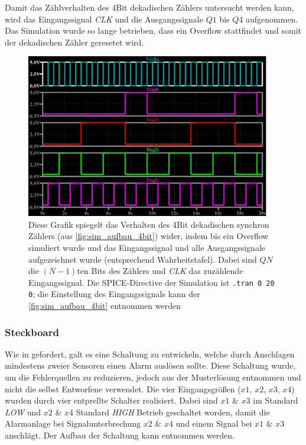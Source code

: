 \documentclass[12pt,english,ngerman]{scrartcl}
\begin{document}
Damit das Zählverhalten des 4Bit dekadischen Zählers untersucht werden kann,
wird das Eingangssignal \textit{CLK} und die Ausgangssignale $Q1$ bis $Q4$
aufgenommen. Das Simulation wurde so lange betrieben, dass ein Overflow
stattfindet und somit der dekadischen Zähler geresetet wird. 

\begin{figure}[H]
  \centering
    \includegraphics[width=0.95\textwidth]{./figures/sim/4bit/4bitdekawahrheit.png}
  \caption{Diese Grafik spiegelt das Verhalten des
    4Bit dekadischen synchron Zählers (aus \autoref{fig:sim_aufbau_4bit})
    wider, indem bis ein Overflow simuliert wurde und das Eingangssignal und
    alle Ausgangssignale aufgezeichnet wurde (entsprechend Wahrheitstafel).
    Dabei sind $QN$ die $(N-1)$ten Bits des Zählers und \textit{CLK} das zuzählende
    Eingangssignal. Die SPICE-Directive der Simulation ist \texttt{.tran 0 20 0}; die
    Einstellung des Eingangssignals kann der \autoref{fig:sim_aufbau_4bit}
    entnommen werden}
  \label{fig:sim_alarm_wahrheit}
\end{figure}


\subsubsection{Steckboard}
Wie in  gefordert, galt es eine Schaltung
zu entwickeln, welche durch Anschlagen mindestens zweier Sensoren einen Alarm auslösen
sollte. Diese Schaltung wurde, um die Fehlerquellen zu reduzieren, jedoch aus der
Musterlösung entnommen und nicht die selbst Entworfene verwendet. Die vier
Eingangsgrößen ($x1$, $x2$, $x3$, $x4$) wurden durch vier entprellte
Schalter realisiert. Dabei sind $x1$ \& $x3$ im Standard \textit{LOW} und
$x2$ \& $x4$ Standard \textit{HIGH} Betrieb geschaltet worden, damit die
Alarmanlage bei Signalunterbrechung $x2$ \& $x4$ und einem Signal bei $x1$
\& $x3$ anschlägt. Der Aufbau der Schaltung kann 
entnommen werden.
\end{document}
